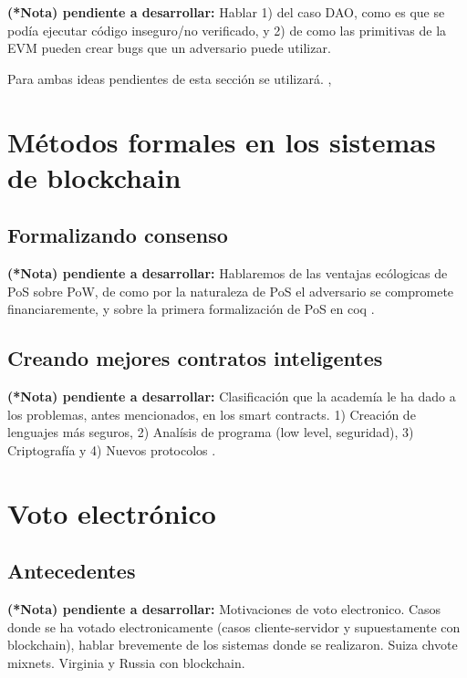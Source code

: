 \documentclass[14pt,letterpaper]{article}
\begin{document}
{\small {\bf (*Nota) pendiente a desarrollar:} Hablar 1) del caso DAO, como es que
  se podía ejecutar código inseguro/no verificado, y 2) de como las primitivas
  de la EVM pueden crear bugs que un adversario puede utilizar.}

Para ambas ideas pendientes de esta sección se utilizará. \cite{scANDformalMethods},
\cite{surveysc}

\section{Métodos formales en los sistemas de blockchain}

\subsection{Formalizando consenso}

{\small {\bf (*Nota) pendiente a desarrollar:} Hablaremos de las ventajas
  ecólogicas de PoS sobre PoW, de como por la naturaleza de PoS el adversario
  se compromete financiaremente, y sobre la primera formalización de PoS en coq}
\cite{PoSCoq}.

\subsection{Creando mejores contratos inteligentes}

{\small {\bf (*Nota) pendiente a desarrollar:} Clasificación que la
  academía le ha dado a los problemas, antes mencionados, en los smart contracts.
  1) Creación de lenguajes más seguros, 2) Analísis de programa (low level, seguridad),
  3) Criptografía y 4) Nuevos protocolos } \cite{scANDformalMethods}\cite{surveysc}.
           
\section{Voto electrónico}

\subsection{Antecedentes}

{\small {\bf (*Nota) pendiente a desarrollar:} Motivaciones de voto electronico.
Casos donde se ha votado electronicamente (casos cliente-servidor y supuestamente con
blockchain), hablar brevemente de los sistemas donde se realizaron. Suiza chvote mixnets.
Virginia y Russia con blockchain.}
\end{document}
